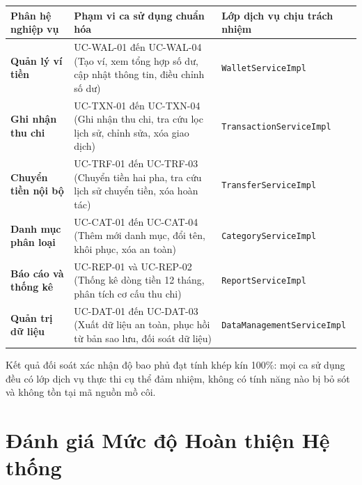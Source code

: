 \documentclass[a4paper,12pt]{report}
\newcommand{\passthrough}[1]{#1}
\newcounter{none}
\begin{document}
{\def\LTcaptype{none} %
\begin{longtable}[]{@{}
  >{\raggedright\arraybackslash}p{}
  >{\raggedright\arraybackslash}p{}
  >{\raggedright\arraybackslash}p{}@{}}
\toprule\noalign{}
\begin{minipage}[b]{\linewidth}\raggedright
Phân hệ nghiệp vụ
\end{minipage} & \begin{minipage}[b]{\linewidth}\raggedright
Phạm vi ca sử dụng chuẩn hóa
\end{minipage} & \begin{minipage}[b]{\linewidth}\raggedright
Lớp dịch vụ chịu trách nhiệm
\end{minipage} \\
\midrule\noalign{}
\endhead
\bottomrule\noalign{}
\endlastfoot
\textbf{Quản lý ví tiền} & UC-WAL-01 đến UC-WAL-04 (Tạo ví, xem tổng hợp
số dư, cập nhật thông tin, điều chỉnh số dư) &
\passthrough{\lstinline!WalletServiceImpl!} \\
\textbf{Ghi nhận thu chi} & UC-TXN-01 đến UC-TXN-04 (Ghi nhận thu chi,
tra cứu lọc lịch sử, chỉnh sửa, xóa giao dịch) &
\passthrough{\lstinline!TransactionServiceImpl!} \\
\textbf{Chuyển tiền nội bộ} & UC-TRF-01 đến UC-TRF-03 (Chuyển tiền hai
pha, tra cứu lịch sử chuyển tiền, xóa hoàn tác) &
\passthrough{\lstinline!TransferServiceImpl!} \\
\textbf{Danh mục phân loại} & UC-CAT-01 đến UC-CAT-04 (Thêm mới danh
mục, đổi tên, khôi phục, xóa an toàn) &
\passthrough{\lstinline!CategoryServiceImpl!} \\
\textbf{Báo cáo và thống kê} & UC-REP-01 và UC-REP-02 (Thống kê dòng
tiền 12 tháng, phân tích cơ cấu thu chi) &
\passthrough{\lstinline!ReportServiceImpl!} \\
\textbf{Quản trị dữ liệu} & UC-DAT-01 đến UC-DAT-03 (Xuất dữ liệu an
toàn, phục hồi từ bản sao lưu, đối soát dữ liệu) &
\passthrough{\lstinline!DataManagementServiceImpl!} \\
\end{longtable}
}

Kết quả đối soát xác nhận độ bao phủ đạt tính khép kín 100\%: mọi ca sử
dụng đều có lớp dịch vụ thực thi cụ thể đảm nhiệm, không có tính năng
nào bị bỏ sót và không tồn tại mã nguồn mồ côi.

\chapter{Đánh giá Mức độ Hoàn thiện Hệ
thống}\label{ux111uxe1nh-giuxe1-mux1ee9c-ux111ux1ed9-houxe0n-thiux1ec7n-hux1ec7-thux1ed1ng}
\end{document}
